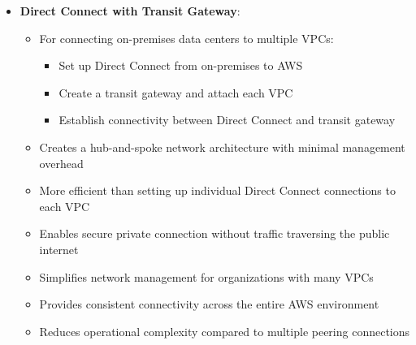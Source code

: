 \documentclass[11pt,a4paper]{report}
\begin{document}
\begin{itemize}
\begin{itemize}
  \item For minimizing data transfer egress costs when accessing data warehouse from corporate offices:
\begin{itemize}
  \item Host visualization tools in the same AWS Region as the data warehouse
  \item Access the visualization tool over Direct Connect from corporate locations
  \item Process queries (e.g., 50 MB results) within AWS network
  \item Only transfer processed visualization data (e.g., 500 KB per webpage) over Direct Connect
\end{itemize}
  \item Significantly reduces egress costs by processing data within AWS before transferring
  \item More cost-effective than querying data warehouse directly over the internet
  \item Better than hosting visualization tools on-premises which would require transferring large query results
  \item More efficient than accessing AWS-hosted visualization tools over the internet
\end{itemize}
  \item \textbf{Direct Connect with Transit Gateway}:
\begin{itemize}
  \item For connecting on-premises data centers to multiple VPCs:
\begin{itemize}
  \item Set up Direct Connect from on-premises to AWS
  \item Create a transit gateway and attach each VPC
  \item Establish connectivity between Direct Connect and transit gateway
\end{itemize}
  \item Creates a hub-and-spoke network architecture with minimal management overhead
  \item More efficient than setting up individual Direct Connect connections to each VPC
  \item Enables secure private connection without traffic traversing the public internet
  \item Simplifies network management for organizations with many VPCs
  \item Provides consistent connectivity across the entire AWS environment
  \item Reduces operational complexity compared to multiple peering connections
\end{itemize}
\end{itemize}
\end{document}
